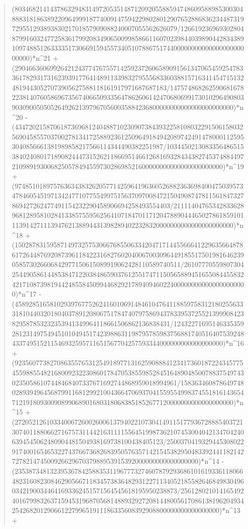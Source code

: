 \documentclass[11pt,a4paper]{article}
\theoremstyle{plain}
\theoremstyle{definition}
\begin{document}
\begin{quote}
(8034682141437863294831497205351487120920558859474860958898530030488831818638922096499918774009147594229802801290765288683623448731972955129389383021701857909088240007055562626079/12661923696930280487991603247725836179920834906500998586611607023984403989044283438910974885126333351730669159455734051078867517440000000000000000000000000)*n\^{}21 + (2904663606992642124377476755714259237260658909156134706545925478336178293173162393917764148911339832795556833603881571634145471513248194430527073905627588118161917971687687183/147574868262590681678223814076058696735674066509335647862606142470680699173010296490803903090050505264926213979670560035884236800000000000000000000000)*n\^{}20 - (434720215870618736968124048871023090738439322581080322915061580325690458557037002781341725889236125096491849420897424914780001125953040856661381989858217566114344490382251987/1034450213083356486515384024080171890824447315262118669514661268169328434382745374884497210989193006825057849455973028698521600000000000000000000000)*n\^{}19 + (97485101897576363438326205771425964196360526882363698400475039573478460545197134247710775549975156370970084721504908747811561847327869427262477491154232290458906694258493554403/21111404765342833628968128958102841338575595625641071847011712047889044465027861859101113914271113947621388944313982894022328320000000000000000000000)*n\^{}18 + (15028783159587149732575306676855063342047171445566641229635664878617264487692087396118422316827602040067003096449185517501981646239058573026606842977150615089919062428110589740511/261077705598073042544905861448538471220384865903761255174711505658894516550844558324217108739819442485584509944682921789409460224000000000000000000000)*n\^{}17 - (45892851658102939767752624160106914846104764118859758312180255633318104403201804037891208067517847407975869437833953725521399908423829587853232353941349964118661506862136838431/12432271695146335359281231497549451010494517423988631198795785983756881740516407539248433749515211546932595711651567704257593344000000000000000000)*n\^{}16 + (9235607738270863557653125491897713162590888412341736018722434577545598855482168009232230860178470538559852845164890485007883754974302350586107448468407337671692744868959018994961/158363460878649748028939496456879911681299210043664706937041559554998374551816143654712191809300908990689016803180683851852677120000000000000000000)*n\^{}15 + (272052126103340067260026006137940221073041491151779367288854037213074011880662716757311442163111155645199873621074530040421347042406394545062480904481504938169738100438405123/250037041932944530802291740016546532274376673682683950576357142154538295048339244118214272782147450092662967037988953915392000000000000000000)*n\^{}14 - (2353873481323953678425883531196777327460787929368610161933611806648231608230846290566711834573836482931227113405218558264684983049603421900344641693362451571564545618195950238873/25612802101416549240167998326371594531968705681488932927208144800561708613819620493425426820129066122799651911186335608392908800000000000000000)*n\^{}13 + 
\end{quote}
\end{document}
